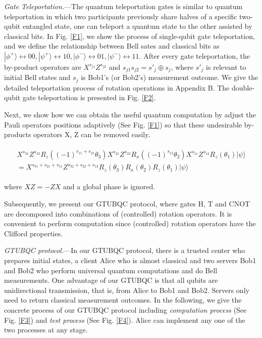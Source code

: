 \documentclass[aps,pra,showpacs,twocolumn,superscriptaddress]{revtex4-1}
\begin{document}
\emph{Gate Teleportation.}---The quantum teleportation gates \cite{Jozsa05,2000MAN,Chuang99,Nielsen03,Nielsen04} is similar to quantum teleportation in which two participants previously share halves of a specific two-qubit entangled state, one can teleport a quantum state to the other assisted by classical bits. In Fig. \ref{F1}, we show the process of single-qubit gate teleportation, and we define the relationship between Bell sates and classical bits as $|\phi^+\rangle\leftrightarrow 00, |\psi^+\rangle\leftrightarrow10, |\phi^-\rangle\leftrightarrow01, |\psi^-\rangle\leftrightarrow11$. After every gate teleportation, the by-product operators are $X^{s_{j1}}Z^{s_{j2}}$ and $s_{j1}s_{j2}=s'_j\oplus s_j$, where $s'_j$ is relevant to initial Bell states and $s_j$ is Bob1's (or Bob2's) measurement outcome. We give the detailed teleportation process of rotation operations in Appendix B. The double-qubit gate teleportation is presented in Fig. \ref{F2}.

Next, we show how we can obtain the useful quantum computation by adjust the Pauli operators positions adaptively (See Fig. \ref{F1}) so that these undesirable by-products operators X, Z can be removed easily.
\begin{small}
\begin{eqnarray}
\begin{array}{l}
\displaystyle X^{s_{31}}Z^{s_{32}}R_z((-1)^{s_{11}+s_{21}}\theta_3)X^{s_{21}}Z^{s_{22}}R_x((-1)^{s_{12}}\theta_2) X^{s_{11}}Z^{s_{12}}R_z(\theta_1)|\psi\rangle\\
\displaystyle =X^{s_{31}+s_{21}+s_{11}}Z^{s_{32}+s_{22}+s_{12}}R_z(\theta_3)R_x(\theta_2)R_z(\theta_1)|\psi\rangle
\end{array}
\end{eqnarray}
\end{small}
\noindent where $XZ=-ZX$ and a global phase is ignored.

Subsequently, we present our GTUBQC protocol, where gates H, T and CNOT are decomposed into combinations of (controlled) rotation operators. It is convenient to perform computation since (controlled) rotation operators have the Clifford properties.


\emph{GTUBQC protocol.}---In our GTUBQC protocol, there is a trusted center who prepares initial states, a client Alice who is almost classical and two servers Bob1 and Bob2 who perform universal quantum computations and do Bell measurements. One advantage of our GTUBQC is that all qubits are unidirectional transmission, that is, from Alice to Bob1 and Bob2. Servers only need to return classical measurement outcomes. In the following, we give the concrete process of our GTUBQC protocol including \emph{computation process} (See Fig. \ref{F3}) and \emph{test process} (See Fig. \ref{F4}). Alice can implement any one of the two processes at any stage.
\end{document}
